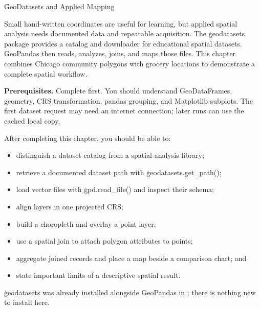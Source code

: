 
\h{GeoDatasets and Applied Mapping}
\label{ch:16}

Small hand-written coordinates are useful for learning, but applied spatial
analysis needs documented data and repeatable acquisition. The
\c{geodatasets} package provides a catalog and downloader for educational
spatial datasets. GeoPandas then reads, analyzes, joins, and maps those files.
This chapter combines Chicago community polygons with grocery locations to
demonstrate a complete spatial workflow.

\begin{NoteBox}
\textbf{Prerequisites.} Complete  first. You should
understand GeoDataFrames, geometry, CRS transformation, pandas grouping, and
Matplotlib subplots. The first dataset request may need an internet connection;
later runs can use the cached local copy.
\end{NoteBox}

\begin{tcolorbox}[title=Learning outcomes,colframe=orange,colback=white,arc=2mm]
After completing this chapter, you should be able to:
\begin{itemize}
    \item distinguish a dataset catalog from a spatial-analysis library;
    \item retrieve a documented dataset path with \c{geodatasets.get_path()};
    \item load vector files with \c{gpd.read_file()} and inspect their schema;
    \item align layers in one projected CRS;
    \item build a choropleth and overlay a point layer;
    \item use a spatial join to attach polygon attributes to points;
    \item aggregate joined records and place a map beside a comparison chart;
          and
    \item state important limits of a descriptive spatial result.
\end{itemize}
\end{tcolorbox}


\begin{NoteBox}
\c{geodatasets} was already installed alongside GeoPandas in
; there is nothing new to install here.
\end{NoteBox}

